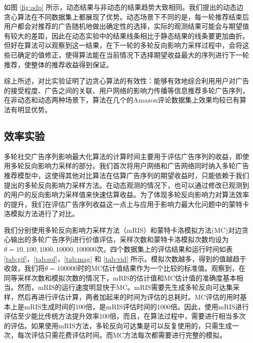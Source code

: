 如图 \ref{fig:adp} 所示，动态结果与非动态的结果趋势大致相同。我们提出的动态边贪心算法在不同数据集上都展现了优势。动态场景下不同的是，每一轮推荐结束后用户都会对推荐的广告随机地做出确定性的选择，实际的观测结果可能会与期望值有较大的差距，因此在动态实验中的结果线条相比于静态结果的线条要更加曲折。但好在算法可以观察到这一结果，在下一轮的多轮反向影响力采样过程中，会将这些已确定的值修正，使得算法能在当前情况下选择期望收益最大的序列进行下一轮推荐，使整体的推荐收益得到保证。

综上所述，对比实验证明了边贪心算法的有效性：能够有效地综合利用用户对广告的接受程度、广告之间的关联、用户网络的影响力传播等信息推荐多轮广告序列，在非动态和动态两种场景下，算法在几个的Amazon评论数据集上效果均较已有算法有明显优势。

\subsection{效率实验}

多轮社交广告序列影响最大化算法的计算时间主要用于评估广告序列的收益，即使用多轮反向影响力采样的部分。我们首次将用户网络和广告网络同时纳入多轮广告推荐模型中，这使得其他对比算法在估算广告序列的期望收益时，只能依赖于我们提出的多轮反向影响力采样方法。在动态观测的情况下，也可以通过修改已观测到的用户的反向影响力采样值来快速估算收益。为了体现多轮反向影响力对算法效率的提升，我们在评估广告序列收益这一点上与应用于影响力最大化问题中的蒙特卡洛模拟方法\cite{kempe2003maximizing}进行了对比。

我们分别使用多轮反向影响力采样方法（mRIS）和蒙特卡洛模拟方法(MC)对边贪心输出的多轮广告序列进行价值评估，采样次数和蒙特卡洛模拟次数均设为$\theta={10,100,1000,10000,100000}$次。四个数据集上的评估结果和运行时间如表 \ref{tab:gif}，\ref{tab:sof}，\ref{tab:mag} 和 \ref{tab:vid} 所示。模拟次数越多，得到的值越趋于收敛，我们将$\theta=100000$时的MC估计值结果作为一个比较的标准值。观察到，在同等采样次数和模拟次数的情况下，mRIS的估计值和MC估计值的准确度基本相当。然而，mRIS的运行速度明显快于MC。mRIS需要先生成多轮反向可达集采样，然后再进行评估计算，两者加起来的时间为评估的总耗时。MC评估的用时基本上是mRIS生成时间的100倍，是mRIS评估时间的1000倍。因此，使用mRIS进行评估至少能比传统方法提升效率100倍，而且，在算法过程中，需要进行相当多次的评估。如果使用mRIS方法，多轮反向可达集是可以反复使用的，只需生成一次，每次评估只需花费评估时间。而MC方法每次都需要进行完整的模拟。

